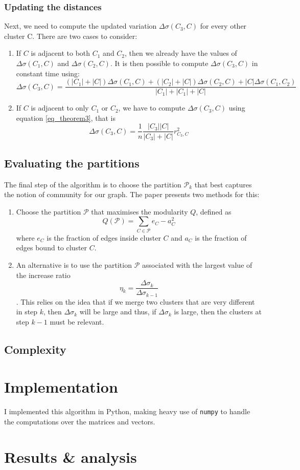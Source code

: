 \documentclass[12pt]{article}
\theoremstyle{definition}
\begin{document}
\subsubsection{Updating the distances}
Next, we need to compute the updated variation $\Delta\sigma(C_3, C)$ for every other cluster C. There are two cases to consider:
\begin{enumerate}
	\item If $C$ is adjacent to both $C_1$ and $C_2$, then we already have the values of $\Delta\sigma(C_1, C)$ and $\Delta\sigma(C_2, C)$. It is then possible to compute $\Delta\sigma(C_3, C)$ in constant time using:
	\[\Delta\sigma(C_3, C) = \frac{(|C_1| + |C|) \Delta\sigma(C_1,C) + (|C_2| + |C|) \Delta\sigma(C_2,C) + |C| \Delta\sigma(C_1,C_2)}{|C_1| + |C_1| + |C|}\]
	\item If $C$ is adjacent to only $C_1$ or $C_2$, we have to compute $\Delta\sigma(C_3, C)$ using equation \ref{eq_theorem3}, that is
	\[ \Delta\sigma(C_3,C) = \frac{1}{n}\frac{|C_3||C|}{|C_3| + |C|} r_{C_3,C}^2 \]
\end{enumerate}

\subsection{Evaluating the partitions}
The final step of the algorithm is to choose the partition $\mathcal{P}_k$ that best captures the notion of community for our graph. The paper presents two methods for this:
\begin{enumerate}
	\item Choose the partition $\mathcal{P}$ that maximises the modularity $Q$, defined as
	\[ Q(\mathcal{P}) = \sum	_{C \in \mathcal{P}} e_C - a_C^2\] 
	where $e_C$ is the fraction of edges inside cluster $C$ and $a_C$ is the fraction of edges bound to cluster $C$.
	\item An alternative is to use the partition $\mathcal{P}$ associated with the largest value of the increase ratio
	\[ \eta_k = \frac{\Delta\sigma_k}{\Delta\sigma_{k-1}}\].
	This relies on the idea that if we merge two clusters that are very different in step $k$, then $\Delta\sigma_k$ will be large and thus, if $\Delta\sigma_k$ is large, then the clusters at step $k-1$ must be relevant.
\end{enumerate}

\subsection{Complexity}

\section{Implementation}
I implemented this algorithm in Python, making heavy use of \texttt{numpy} to handle the computations over the matrices and vectors.
\section{Results \& analysis}
\end{document}
